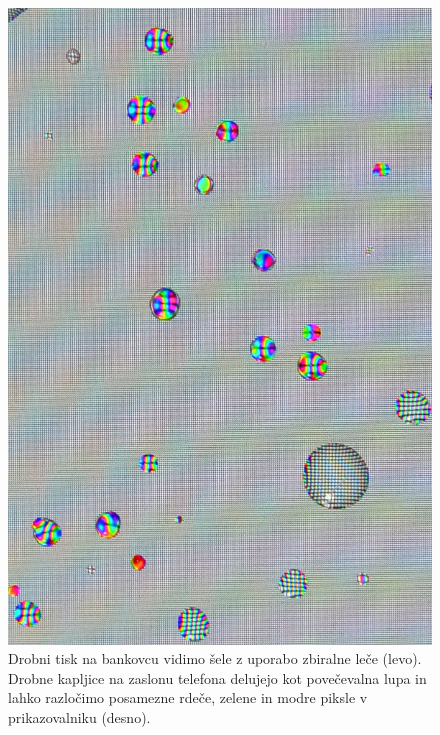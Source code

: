 \begin{figure}[ht]
\includegraphics[width=7truecm]{slike/02_photos_kapljice.jpg}
\caption{Drobni tisk na bankovcu vidimo šele z uporabo zbiralne leče (levo). 
Drobne kapljice na zaslonu telefona delujejo kot povečevalna lupa in lahko 
razločimo posamezne rdeče, zelene in modre piksle v prikazovalniku (desno).}
\label{fig:02_photos-1}
\end{figure}

